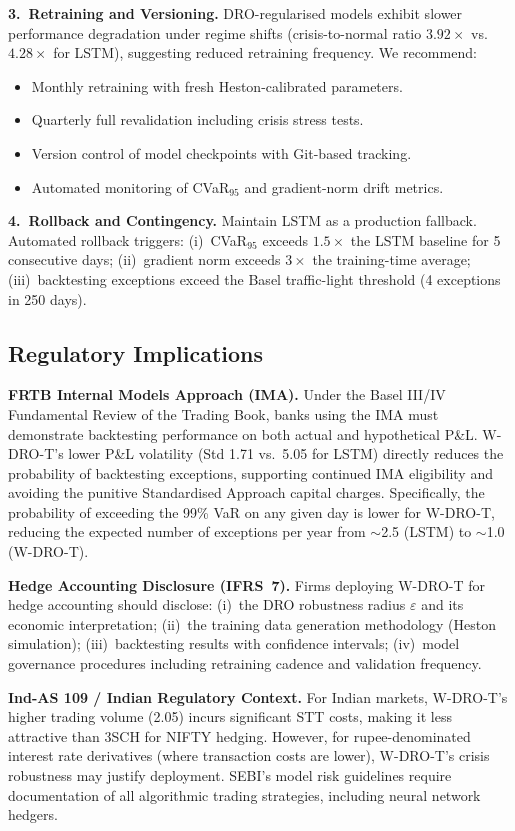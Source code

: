 \documentclass[11pt]{article}
\begin{document}
\textbf{3.\ Retraining and Versioning.}
DRO-regularised models exhibit slower performance degradation under regime shifts (crisis-to-normal ratio $3.92\times$ vs.\ $4.28\times$ for LSTM), suggesting reduced retraining frequency.  We recommend:
\begin{itemize}[noitemsep]
    \item Monthly retraining with fresh Heston-calibrated parameters.
    \item Quarterly full revalidation including crisis stress tests.
    \item Version control of model checkpoints with Git-based tracking.
    \item Automated monitoring of CVaR$_{95}$ and gradient-norm drift metrics.
\end{itemize}

\textbf{4.\ Rollback and Contingency.}
Maintain LSTM as a production fallback.  Automated rollback triggers: (i)~CVaR$_{95}$ exceeds $1.5\times$ the LSTM baseline for 5 consecutive days; (ii)~gradient norm exceeds $3\times$ the training-time average; (iii)~backtesting exceptions exceed the Basel traffic-light threshold (4 exceptions in 250 days).

\subsection{Regulatory Implications}

\textbf{FRTB Internal Models Approach (IMA).}
Under the Basel III/IV Fundamental Review of the Trading Book, banks using the IMA must demonstrate backtesting performance on both actual and hypothetical P\&L.  W-DRO-T's lower P\&L volatility (Std 1.71 vs.\ 5.05 for LSTM) directly reduces the probability of backtesting exceptions, supporting continued IMA eligibility and avoiding the punitive Standardised Approach capital charges.  Specifically, the probability of exceeding the 99\% VaR on any given day is lower for W-DRO-T, reducing the expected number of exceptions per year from $\sim$2.5 (LSTM) to $\sim$1.0 (W-DRO-T).

\textbf{Hedge Accounting Disclosure (IFRS~7).}
Firms deploying W-DRO-T for hedge accounting should disclose: (i)~the DRO robustness radius $\varepsilon$ and its economic interpretation; (ii)~the training data generation methodology (Heston simulation); (iii)~backtesting results with confidence intervals; (iv)~model governance procedures including retraining cadence and validation frequency.

\textbf{Ind-AS 109 / Indian Regulatory Context.}
For Indian markets, W-DRO-T's higher trading volume (2.05) incurs significant STT costs, making it less attractive than 3SCH for NIFTY hedging.  However, for rupee-denominated interest rate derivatives (where transaction costs are lower), W-DRO-T's crisis robustness may justify deployment.  SEBI's model risk guidelines require documentation of all algorithmic trading strategies, including neural network hedgers.
\end{document}
